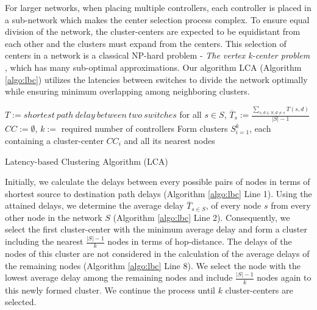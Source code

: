 \documentclass[final,5p,times]{cas-dc}
\begin{document}
	For larger networks, when placing multiple controllers, each controller is placed in a sub-network which makes the center selection process complex. To ensure equal division of the network, the cluster-centers are expected to be equidistant from each other and the clusters must expand from the centers. This selection of centers in a network is a classical NP-hard problem - \textit{The vertex k-center problem} \cite{kariv1979algorithmic}, which has many sub-optimal approximations. Our algorithm LCA (Algorithm \ref{algo:lbc}) utilizes the latencies between switches to divide the network optimally while ensuring minimum overlapping among neighboring clusters.
	
	\begin{algorithm}
		\SetAlgoLined
		$T := shortest~path~delay~between~two~switches$\;
		for all $s\in S$, $\overline{T}_s := \frac{\sum_{s,d \in S, d \ne s}T(s,d)}{|S|-1}$\;
		$CC := \emptyset$, $k :=$ required number of controllers\;
		Form clusters $S_{i=1}^k$, each containing a cluster-center $CC_i$ and all its nearest nodes\;
		\caption{Latency-based Clustering Algorithm (LCA)} \label{algo:lbc}
	\end{algorithm}

	Initially, we calculate the delays between every possible pairs of nodes in terms of shortest source to destination path delays (Algorithm \ref{algo:lbc} Line 1). Using the attained delays, we determine the average delay $\overline{T}_{s\in S}$, of every node $s$ from every other node in the network $S$ (Algorithm \ref{algo:lbc} Line 2). Consequently, we select the first cluster-center with the minimum average delay and form a cluster including the nearest $\frac{|S|-1}{k}$ nodes in terms of hop-distance. The delays of the nodes of this cluster are not considered in the calculation of the average delays of the remaining nodes (Algorithm \ref{algo:lbc} Line 8). We select the node with the lowest average delay among the remaining nodes and include $\frac{|S|-1}{k}$ nodes again to this newly formed cluster. We continue the process until $k$ cluster-centers are selected.
	
\end{document}
